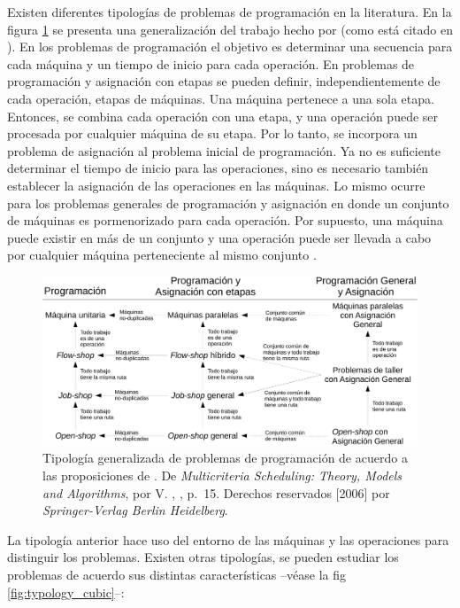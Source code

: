 \documentclass[spanish,draft,12pt,headsepline,footsepline,paper=letter]{scrreprt}
\begin{document}
Existen diferentes tipologías de problemas de programación en la literatura. En la figura \ref{fig:typology_maccarthy} se presenta una generalización del trabajo hecho por \citet{maccarthy1993addressing} (como está citado en \citealp[p.~14]{TKindt2002}). En los problemas de programación el objetivo es determinar una secuencia para cada máquina y un tiempo de inicio para cada operación. En problemas de programación y asignación con etapas se pueden definir, independientemente de cada operación, etapas de máquinas. Una máquina pertenece a una sola etapa. Entonces, se combina cada operación con una etapa, y una operación puede ser procesada por cualquier máquina de su etapa. Por lo tanto, se incorpora un problema de asignación al problema inicial de programación. Ya no es suficiente determinar el tiempo de inicio para las operaciones, sino es necesario también establecer la asignación de las operaciones en las máquinas. Lo mismo ocurre para los problemas generales de programación y asignación en donde un conjunto de máquinas es pormenorizado para cada operación. Por supuesto, una máquina puede existir en más de un conjunto y una operación puede ser llevada a cabo por cualquier máquina perteneciente al mismo conjunto \citep[p.~14,~15]{TKindt2002}.

\begin{figure}[hbtp]
\centering
\includegraphics[width=.9\textwidth]{media/typology_maccarthy_spanish.pdf}
\caption[Tipología basada en el contexto de máquinas y operaciones]{Tipología generalizada de problemas de programación de acuerdo a las proposiciones de \citet{maccarthy1993addressing}. De \textit{Multicriteria Scheduling: Theory, Models and Algorithms}, por V. \citeauthor{TKindt2002}, \citeyear{TKindt2002}, p.~15. Derechos reservados [2006] por \textit{Springer-Verlag Berlin Heidelberg}.}
\label{fig:typology_maccarthy}
\end{figure}

La tipología anterior hace uso del entorno de las máquinas y las operaciones para distinguir los problemas. Existen otras tipologías, se pueden estudiar los problemas de acuerdo sus distintas características –véase la fig \ref{fig:typology_cubic}–:
\end{document}
